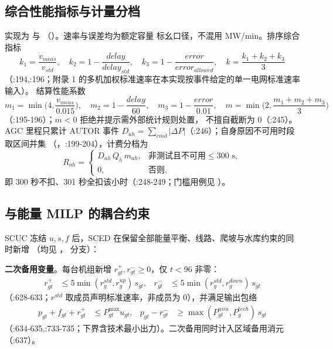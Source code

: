 \subsection{综合性能指标与计量分档}
实现为  与 
（）。速率与误差均为额定容量
标幺口径，不混用 MW/min。排序综合指标
\begin{equation}
 k_1=\frac{v_{meas}}{v_{std}},\quad
 k_2=1-\frac{delay}{delay_{std}},\quad
 k_3=1-\frac{error}{error_{allowed}},\quad
 k=\frac{k_1+k_2+k_3}{3}
\end{equation}
（:194,:196；附录 1 的多机加权标准速率在本实现按事件给定的单一电网标准速率输入）。
结算性能系数
\begin{equation}
 m_1=\min\!\Big(4,\frac{v_{meas}}{0.015}\Big),\quad
 m_2=1-\frac{delay}{60},\quad
 m_3=1-\frac{error}{0.01},\quad
 m=\min\!\Big(2,\frac{m_1+m_2+m_3}{3}\Big)
\end{equation}
（:195-196）；$m<0$ 拒绝并提示需外部统计规则处置，
不擅自截断为 0（:245）。AGC 里程只累计 AUTOR 事件
$D_{ah}=\sum_{cmd}|\Delta P|$（:246）；自身原因不可用时段取区间并集
（，:199-204），计费分档为
\begin{equation}
 R_{ah}=\begin{cases}D_{ah}\,Q_h\,m_{ah},&\text{非测试且不可用}\le300\text{ s},\\0,&\text{否则},\end{cases}
\end{equation}
即 300 秒不扣、301 秒全扣该小时（:248-249；门槛用例见
）。

\subsection{与能量 MILP 的耦合约束}
SCUC 冻结 $u,s,f$ 后，SCED 在保留全部能量平衡、线路、爬坡与水库约束的同时新增
（均见 ， 分支）：

\textbf{二次备用变量}。每台机组新增 $r^+_{gt},r^-_{gt}\ge0$，仅 $t<96$ 非零：
\begin{align}
 r^+_{gt}&\le 5\min(r^{std}_g,r^{up}_g)\,s_{gt},&
 r^-_{gt}&\le 5\min(r^{std}_g,r^{down}_g)\,s_{gt}
\end{align}
（:628-633；$r^{std}$ 取成员声明标准速率，非成员为 0），并满足输出包络
\begin{align}
 p_{gt}+f_{gt}+r^+_{gt}&\le P^{\max}_{gt}u_{gt},&
 p_{gt}-r^-_{gt}&\ge \max(P^{min}_{gt},P^{tech}_{g})\,s_{gt}
\end{align}
（:634-635,:733-735；下界含技术最小出力）。二次备用同时计入区域备用消元
（:637）。

